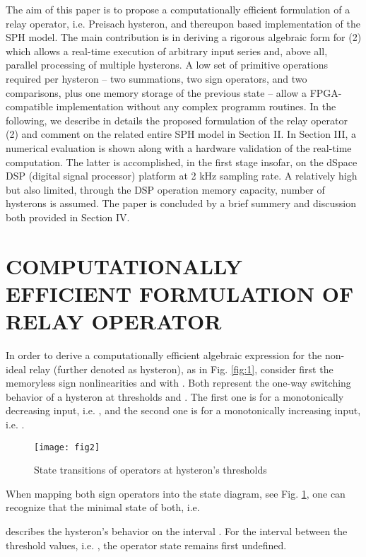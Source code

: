 \documentclass[journal]{IEEEtran}
\begin{document}
The aim of this paper is to propose a computationally efficient
formulation of a relay operator, i.e. Preisach hysteron, and
thereupon based implementation of the SPH model. The main
contribution is in deriving a rigorous algebraic form for (2)
which allows a real-time execution of arbitrary input series and,
above all, parallel processing of multiple hysterons. A low set of
primitive operations required per hysteron -- two summations, two
sign operators, and two comparisons, plus one memory storage of
the previous state -- allow a FPGA-compatible implementation
without any complex programm routines. In the following, we
describe in details the proposed formulation of the relay operator
(2) and comment on the related entire SPH model in Section II. In
Section III, a numerical evaluation is shown along with a hardware
validation of the real-time computation. The latter is
accomplished, in the first stage insofar, on the dSpace DSP
(digital signal processor) platform at 2 kHz sampling rate. A
relatively high but also limited, through the DSP operation memory
capacity, number of hysterons  is assumed. The paper is
concluded by a brief summery and discussion both provided in
Section IV.



\section{COMPUTATIONALLY EFFICIENT FORMULATION OF RELAY OPERATOR}
\label{sec:2}


In order to derive a computationally efficient algebraic
expression for the non-ideal relay (further denoted as hysteron),
as in Fig. \ref{fig:1}, consider first the memoryless sign
nonlinearities  and
 with . Both represent the one-way switching behavior of a
hysteron at thresholds  and . The first one is for
a monotonically decreasing input, i.e. , and the second
one is for a monotonically increasing input, i.e. .
\begin{figure}[!h]
\centering
\texttt{[image: fig2]}
\caption{State transitions of  operators at
hysteron's thresholds} \label{fig:2}
\end{figure}
When mapping both sign operators into the  state diagram,
see Fig. \ref{fig:2}, one can recognize that the minimal state of
both, i.e.

describes the hysteron's behavior on the interval . For the interval between the
threshold values, i.e. , the operator
state remains first undefined.
\end{document}
